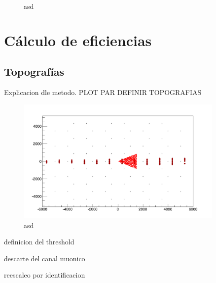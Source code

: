 \begin{figure}[ht!]
		\caption{\label{fig:radioShWeights}
		asd
		}
	\end{figure}
	
	
\section{C\'alculo de eficiencias}
	
	\subsection{Topograf\'ias}
	
	Explicacion dle metodo.
	PLOT PAR DEFINIR TOPOGRAFIAS
	
	
	\begin{figure}[h!]
		\begin{center}
			\includegraphics[width=0.9\textwidth]{fig/resultadosRadio/17_00_89_90_00_00_00000_01238_60}
			\caption{asd}
			\label{fig:}
		\end{center}
	\end{figure}
	
	definicion del threshold
	
	descarte del canal muonico
	
	reescaleo por identificacion
	
